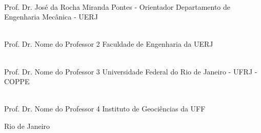 \begin{flushright}
\parbox{12cm}{

\singlespacing

\hrulefill \\

\vspace{-.4cm}
Prof. Dr. José da Rocha Miranda Pontes - Orientador
\newline
Departamento de Engenharia Mecânica - UERJ
\vspace{.7cm}

\hrulefill \\

\vspace{-.4cm}
Prof. Dr. Nome do Professor 2
\newline
Faculdade de Engenharia da UERJ
\vspace{.7cm}

\hrulefill \\

\vspace{-.4cm}
Prof. Dr. Nome do Professor 3
\newline
Universidade Federal do Rio de Janeiro - UFRJ - COPPE
\vspace{.7cm}

\hrulefill \\

\vspace{-.4cm}
Prof. Dr. Nome do Professor 4
\newline
Instituto de Geociências da UFF
\vspace{.7cm}



}
\end{flushright}
\vfill

\begin{center}
Rio de Janeiro
\end{center}